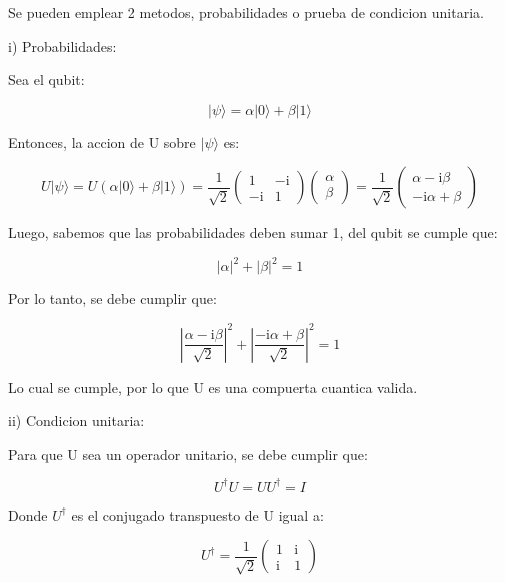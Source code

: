 \documentclass[11pt]{article}
\newcommand{\ii}{\mathrm{i}}
\begin{document}
Se pueden emplear 2 metodos, probabilidades o prueba de condicion unitaria.

i) Probabilidades:

Sea el qubit:

\begin{equation}
    |\psi\rangle = \alpha |0\rangle + \beta |1\rangle
\end{equation}

Entonces, la accion de U sobre $|\psi\rangle$ es:

\begin{equation}
    U |\psi\rangle = U (\alpha |0\rangle + \beta |1\rangle) = \frac{1}{\sqrt{2}} \begin{pmatrix} 1 & -\ii \\ -\ii & 1 \end{pmatrix} \begin{pmatrix} \alpha \\ \beta \end{pmatrix} = \frac{1}{\sqrt{2}} \begin{pmatrix} \alpha - \ii \beta \\ -\ii \alpha + \beta \end{pmatrix}
\end{equation}

Luego, sabemos que las probabilidades deben sumar 1, del qubit se cumple que:

\begin{equation}
    |\alpha|^2 + |\beta|^2 = 1
\end{equation}

Por lo tanto, se debe cumplir que:

\begin{equation}
    \left| \frac{\alpha - \ii \beta}{\sqrt{2}} \right|^2 + \left| \frac{-\ii \alpha + \beta}{\sqrt{2}} \right|^2 = 1
\end{equation}

Lo cual se cumple, por lo que U es una compuerta cuantica valida.

ii) Condicion unitaria:

Para que U sea un operador unitario, se debe cumplir que:

\begin{equation}
    U^\dagger U = U U^\dagger = I
\end{equation}

Donde $U^\dagger$ es el conjugado transpuesto de U igual a:

\begin{equation}
    U^\dagger = \frac{1}{\sqrt{2}} \begin{pmatrix} 1 & \ii \\ \ii & 1 \end{pmatrix}
\end{equation}
\end{document}
